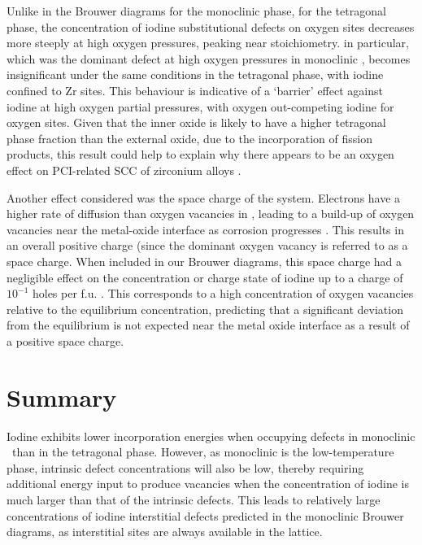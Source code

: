 Unlike in the Brouwer diagrams for the monoclinic phase, for the tetragonal phase, the concentration of iodine substitutional defects on oxygen sites decreases more steeply at high oxygen pressures, peaking near stoichiometry.  in particular, which was the dominant defect at high oxygen pressures in monoclinic \zirconia , becomes insignificant under the same conditions in the tetragonal phase, with iodine confined to Zr sites. This behaviour is indicative of a `barrier' effect against iodine at high oxygen partial pressures, with oxygen out-competing iodine for oxygen sites. Given that the inner oxide is likely to have a higher tetragonal phase fraction than the external oxide, due to the incorporation of fission products, this result could help to explain why there appears to be an oxygen effect on PCI-related SCC of zirconium alloys \cite{hofmann1984stress}. 

Another effect considered was the space charge of the system. Electrons have a higher rate of diffusion than oxygen vacancies in \zirconia , leading to a build-up of oxygen vacancies near the metal-oxide interface as corrosion progresses \cite{bojinov2010influence}. This results in an overall positive charge (since the dominant oxygen vacancy is  referred to as a space charge. When included in our Brouwer diagrams, this space charge had a negligible effect on the concentration or charge state of iodine up to a charge of $10^{-1}$ holes per f.u. \zirconia . This corresponds to a high concentration of oxygen vacancies relative to the equilibrium concentration, predicting that a significant deviation from the equilibrium is not expected near the metal oxide interface as a result of a positive space charge.


\section{Summary}

Iodine exhibits lower incorporation energies when occupying defects in monoclinic \zirconia\ than in the tetragonal phase. However, as monoclinic is the low-temperature phase, intrinsic defect concentrations will also be low, thereby requiring additional energy input to produce vacancies when the concentration of iodine is much larger than that of the intrinsic defects. This leads to relatively large concentrations of iodine interstitial defects predicted in the monoclinic Brouwer diagrams, as interstitial sites are always available in the lattice. 

